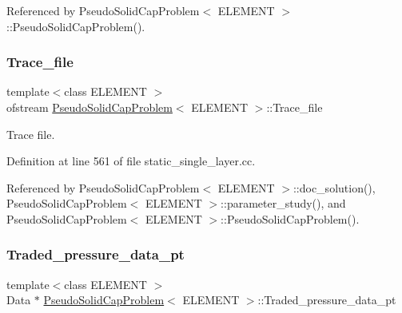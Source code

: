 Referenced by Pseudo\+Solid\+Cap\+Problem$<$ E\+L\+E\+M\+E\+N\+T $>$\+::\+Pseudo\+Solid\+Cap\+Problem().

\mbox{\label{classPseudoSolidCapProblem_a81d2d9915ba7d9a9a691ca2f2080b6b4}} 
\subsubsection{\texorpdfstring{Trace\+\_\+file}{Trace\_file}}
{\footnotesize\ttfamily template$<$class E\+L\+E\+M\+E\+NT $>$ \\
ofstream \hyperlink{classPseudoSolidCapProblem}{Pseudo\+Solid\+Cap\+Problem}$<$ E\+L\+E\+M\+E\+NT $>$\+::Trace\+\_\+file\hspace{0.3cm}{\ttfamily [private]}}



Trace file. 



Definition at line 561 of file static\+\_\+single\+\_\+layer.\+cc.



Referenced by Pseudo\+Solid\+Cap\+Problem$<$ E\+L\+E\+M\+E\+N\+T $>$\+::doc\+\_\+solution(), Pseudo\+Solid\+Cap\+Problem$<$ E\+L\+E\+M\+E\+N\+T $>$\+::parameter\+\_\+study(), and Pseudo\+Solid\+Cap\+Problem$<$ E\+L\+E\+M\+E\+N\+T $>$\+::\+Pseudo\+Solid\+Cap\+Problem().

\mbox{\label{classPseudoSolidCapProblem_a55491b1b87f858b8d711a362f4c70838}} 
\subsubsection{\texorpdfstring{Traded\+\_\+pressure\+\_\+data\+\_\+pt}{Traded\_pressure\_data\_pt}}
{\footnotesize\ttfamily template$<$class E\+L\+E\+M\+E\+NT $>$ \\
Data $\ast$ \hyperlink{classPseudoSolidCapProblem}{Pseudo\+Solid\+Cap\+Problem}$<$ E\+L\+E\+M\+E\+NT $>$\+::Traded\+\_\+pressure\+\_\+data\+\_\+pt\hspace{0.3cm}{\ttfamily [private]}}



